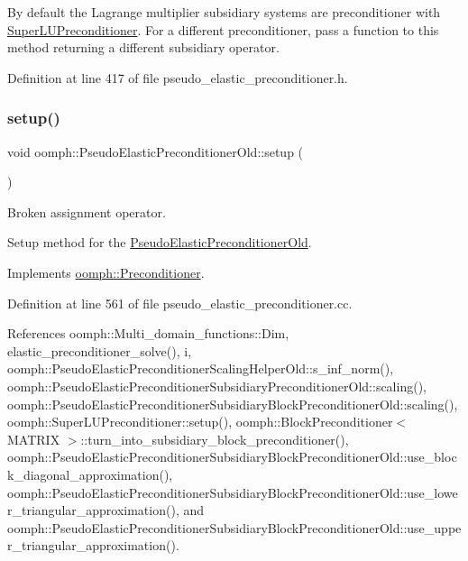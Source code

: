 By default the Lagrange multiplier subsidiary systems are preconditioner with \hyperlink{classoomph_1_1SuperLUPreconditioner}{Super\+L\+U\+Preconditioner}. For a different preconditioner, pass a function to this method returning a different subsidiary operator. 



Definition at line 417 of file pseudo\+\_\+elastic\+\_\+preconditioner.\+h.

\mbox{\label{classoomph_1_1PseudoElasticPreconditionerOld_a25d542a5b98d70be1aa1dd6000402978}} 
\subsubsection{\texorpdfstring{setup()}{setup()}}
{\footnotesize\ttfamily void oomph\+::\+Pseudo\+Elastic\+Preconditioner\+Old\+::setup (\begin{DoxyParamCaption}{ }\end{DoxyParamCaption})\hspace{0.3cm}{\ttfamily [virtual]}}



Broken assignment operator. 

Setup method for the \hyperlink{classoomph_1_1PseudoElasticPreconditionerOld}{Pseudo\+Elastic\+Preconditioner\+Old}. 

Implements \hyperlink{classoomph_1_1Preconditioner_af4886f4efe510e5c9b0eb19422943588}{oomph\+::\+Preconditioner}.



Definition at line 561 of file pseudo\+\_\+elastic\+\_\+preconditioner.\+cc.



References oomph\+::\+Multi\+\_\+domain\+\_\+functions\+::\+Dim, elastic\+\_\+preconditioner\+\_\+solve(), i, oomph\+::\+Pseudo\+Elastic\+Preconditioner\+Scaling\+Helper\+Old\+::s\+\_\+inf\+\_\+norm(), oomph\+::\+Pseudo\+Elastic\+Preconditioner\+Subsidiary\+Preconditioner\+Old\+::scaling(), oomph\+::\+Pseudo\+Elastic\+Preconditioner\+Subsidiary\+Block\+Preconditioner\+Old\+::scaling(), oomph\+::\+Super\+L\+U\+Preconditioner\+::setup(), oomph\+::\+Block\+Preconditioner$<$ M\+A\+T\+R\+I\+X $>$\+::turn\+\_\+into\+\_\+subsidiary\+\_\+block\+\_\+preconditioner(), oomph\+::\+Pseudo\+Elastic\+Preconditioner\+Subsidiary\+Block\+Preconditioner\+Old\+::use\+\_\+block\+\_\+diagonal\+\_\+approximation(), oomph\+::\+Pseudo\+Elastic\+Preconditioner\+Subsidiary\+Block\+Preconditioner\+Old\+::use\+\_\+lower\+\_\+triangular\+\_\+approximation(), and oomph\+::\+Pseudo\+Elastic\+Preconditioner\+Subsidiary\+Block\+Preconditioner\+Old\+::use\+\_\+upper\+\_\+triangular\+\_\+approximation().



